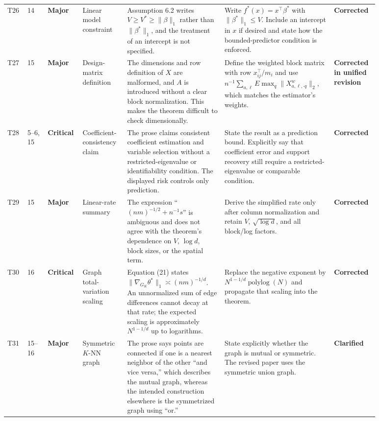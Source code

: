\documentclass[11pt]{article}
\newcommand{\status}[1]{\textcolor{implgreen}{\textbf{#1}}}
\begin{document}
\begin{landscape}
\begin{longtable}{L{0.04\linewidth}L{0.055\linewidth}L{0.065\linewidth}L{0.11\linewidth}L{0.245\linewidth}L{0.275\linewidth}L{0.095\linewidth}}
T26 & 14 & \textcolor{major}{\textbf{Major}} & Linear model constraint & Assumption 6.2 writes $V\ge V^*\ge\|\beta\|_1$ rather than $\|\beta^*\|_1$, and the treatment of an intercept is not specified. & Write $f^*(x)=x^\top\beta^*$ with $\|\beta^*\|_1\le V$. Include an intercept in $x$ if desired and state how the bounded-predictor condition is enforced. & \status{Corrected}\\
T27 & 15 & \textcolor{major}{\textbf{Major}} & Design-matrix definition & The dimensions and row definition of $X$ are malformed, and $A$ is introduced without a clear block normalization. This makes the theorem difficult to check dimensionally. & Define the weighted block matrix with row $x_{ij}^{\top}/m_i$ and use $n^{-1}\sum_{a,\ell}E\max_q\|X^w_{a,\ell,\cdot q}\|_2$, which matches the estimator's weights. & \status{Corrected in unified revision}\\
T28 & 5--6, 15 & \textcolor{crit}{\textbf{Critical}} & Coefficient-consistency claim & The prose claims consistent coefficient estimation and variable selection without a restricted-eigenvalue or identifiability condition. The displayed risk controls only prediction. & State the result as a prediction bound. Explicitly say that coefficient error and support recovery still require a restricted-eigenvalue or comparable condition. & \status{Corrected}\\
T29 & 15 & \textcolor{major}{\textbf{Major}} & Linear-rate summary & The expression “$(nm)^{-1/2}+n^{-1}s$” is ambiguous and does not agree with the theorem’s dependence on $V$, $\log d$, block sizes, or the spatial term. & Derive the simplified rate only after column normalization and retain $V$, $\sqrt{\log d}$, and all block/log factors. & \status{Corrected}\\
T30 & 16 & \textcolor{crit}{\textbf{Critical}} & Graph total-variation scaling & Equation (21) states $\|\nabla_{G_K}\theta^*\|_1\asymp(nm)^{-1/d}$. An unnormalized sum of edge differences cannot decay at that rate; the expected scaling is approximately $N^{1-1/d}$ up to logarithms. & Replace the negative exponent by $N^{1-1/d}\operatorname{polylog}(N)$ and propagate that scaling into the theorem. & \status{Corrected}\\
T31 & 15--16 & \textcolor{major}{\textbf{Major}} & Symmetric $K$-NN graph & The prose says points are connected if one is a nearest neighbor of the other “and vice versa,” which describes the mutual graph, whereas the intended construction elsewhere is the symmetrized graph using “or.” & State explicitly whether the graph is mutual or symmetric. The revised paper uses the symmetric union graph. & \status{Clarified}\\

\end{longtable}
\end{landscape}
\end{document}
